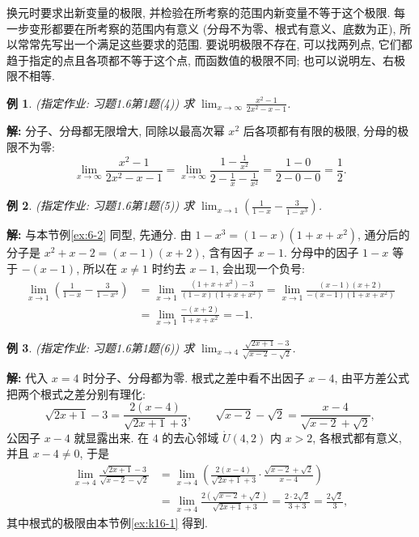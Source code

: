 \documentclass[UTF8,openany]{ctexbook}
\theoremstyle{chinesetextbook}
\newtheorem{example}{例}[section]
\newenvironment{cnsolution}{\par\indent\textbf{解:} \ignorespaces}{\par}
\begin{document}
换元时要求出新变量的极限, 并检验在所考察的范围内新变量不等于这个极限. 每一步变形都要在所考察的范围内有意义 (分母不为零、根式有意义、底数为正), 所以常常先写出一个满足这些要求的范围. 要说明极限不存在, 可以找两列点, 它们都趋于指定的点且各项都不等于这个点, 而函数值的极限不同; 也可以说明左、右极限不相等.
\begin{example}
\textnormal{(指定作业: 习题1.6第1题(4))} 求 $\displaystyle\lim_{x\to\infty}\frac{x^2-1}{2x^2-x-1}$.
\end{example}
\begin{cnsolution}
分子、分母都无限增大, 同除以最高次幂 $x^2$ 后各项都有有限的极限, 分母的极限不为零:
\[
\lim_{x\to\infty}\frac{x^2-1}{2x^2-x-1}=\lim_{x\to\infty}\frac{1-\frac1{x^2}}{2-\frac1x-\frac1{x^2}}=\frac{1-0}{2-0-0}=\frac12.
\]
\end{cnsolution}
\begin{example}
\textnormal{(指定作业: 习题1.6第1题(5))} 求 $\displaystyle\lim_{x\to1}\left(\frac1{1-x}-\frac3{1-x^3}\right)$.
\end{example}
\begin{cnsolution}
与本节例\ref{ex:6-2} 同型, 先通分. 由 $1-x^3=(1-x)(1+x+x^2)$, 通分后的分子是 $x^2+x-2=(x-1)(x+2)$, 含有因子 $x-1$. 分母中的因子 $1-x$ 等于 $-(x-1)$, 所以在 $x\ne1$ 时约去 $x-1$, 会出现一个负号:
\[
\begin{aligned}
\lim_{x\to1}\left(\frac1{1-x}-\frac3{1-x^3}\right)
&=\lim_{x\to1}\frac{(1+x+x^2)-3}{(1-x)(1+x+x^2)}=\lim_{x\to1}\frac{(x-1)(x+2)}{-(x-1)(1+x+x^2)}\\
&=\lim_{x\to1}\frac{-(x+2)}{1+x+x^2}=-1.
\end{aligned}
\]
\end{cnsolution}
\begin{example}
\textnormal{(指定作业: 习题1.6第1题(6))} 求 $\displaystyle\lim_{x\to4}\frac{\sqrt{2x+1}-3}{\sqrt{x-2}-\sqrt2}$.
\end{example}
\begin{cnsolution}
代入 $x=4$ 时分子、分母都为零. 根式之差中看不出因子 $x-4$, 由平方差公式把两个根式之差分别有理化:
\[
\sqrt{2x+1}-3=\frac{2(x-4)}{\sqrt{2x+1}+3},\qquad\sqrt{x-2}-\sqrt2=\frac{x-4}{\sqrt{x-2}+\sqrt2},
\]
公因子 $x-4$ 就显露出来. 在 $4$ 的去心邻域 $\mathring U(4,2)$ 内 $x>2$, 各根式都有意义, 并且 $x-4\ne0$, 于是
\[
\begin{aligned}
\lim_{x\to4}\frac{\sqrt{2x+1}-3}{\sqrt{x-2}-\sqrt2}
&=\lim_{x\to4}\left(\frac{2(x-4)}{\sqrt{2x+1}+3}\cdot\frac{\sqrt{x-2}+\sqrt2}{x-4}\right)\\
&=\lim_{x\to4}\frac{2\left(\sqrt{x-2}+\sqrt2\right)}{\sqrt{2x+1}+3}=\frac{2\cdot2\sqrt2}{3+3}=\frac{2\sqrt2}3,
\end{aligned}
\]
其中根式的极限由本节例\ref{ex:k16-1} 得到.
\end{cnsolution}
\end{document}
